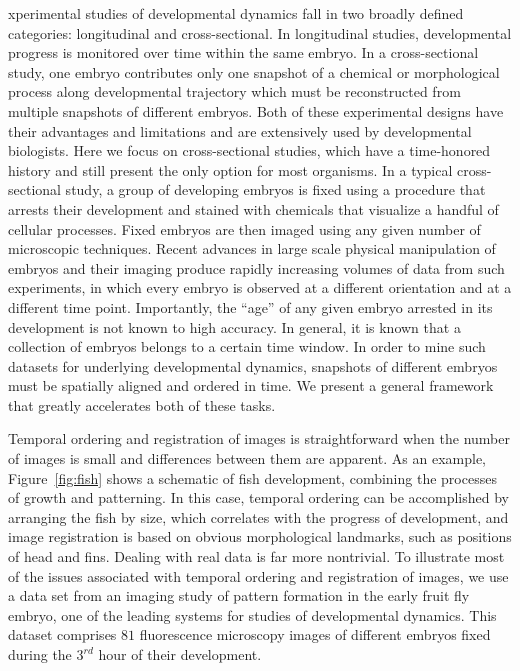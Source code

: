 \documentclass{pnastwo}
\begin{document}
\begin{article}
xperimental studies of developmental dynamics fall in two broadly defined categories: longitudinal and cross-sectional. 
%
In longitudinal studies, developmental progress is monitored over time within the same embryo. 
%
In a cross-sectional study, one embryo contributes only one snapshot of a chemical or morphological process along developmental trajectory which must be reconstructed from multiple snapshots of different embryos. 
%
Both of these experimental designs have their advantages and limitations and are extensively used by developmental biologists. 
%
Here we focus on cross-sectional studies, which have a time-honored history and still present the only option for most organisms. 
%
In a typical cross-sectional study, a group of developing embryos is fixed using a procedure that arrests their development and stained with chemicals that visualize a handful of cellular processes. 
%
Fixed embryos are then imaged using any given number of microscopic techniques. 
%
Recent advances in large scale physical manipulation of embryos and their imaging produce rapidly increasing volumes of data from such experiments, in which every embryo is observed at a different orientation and at a different time point.
%
Importantly, the ``age'' of any given embryo arrested in its development is not known to high accuracy. 
%
In general, it is known that a collection of embryos belongs to a certain time window.
%
In order to mine such datasets for underlying developmental dynamics, snapshots of different embryos must be spatially aligned and ordered in time. 
%
We present a general framework that greatly accelerates both of these tasks.

Temporal ordering and registration of images is straightforward when the number of images is small and differences between them are apparent. 
%
As an example, Figure~\ref{fig:fish} shows a schematic of fish development, combining the processes of growth and patterning.  
%
In this case, temporal ordering can be accomplished by arranging the fish by size, which correlates with the progress of development, and image registration is based on obvious morphological landmarks, such as positions of head and fins. 
%
Dealing with real data is far more nontrivial. 
%
To illustrate most of the issues associated with temporal ordering and registration of images, we use a data set from an imaging study of pattern formation in the early fruit fly embryo, one of the leading systems for studies of developmental dynamics. 
%
This dataset comprises $81$ fluorescence microscopy images of different embryos fixed during the $3^{rd}$ hour of their development. 


\end{article}
\end{document}
